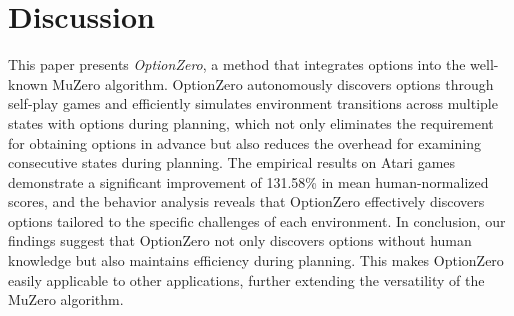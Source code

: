 


\section{Discussion}

This paper presents \textit{OptionZero}, a method that integrates options into the well-known MuZero algorithm.
OptionZero autonomously discovers options through self-play games and efficiently simulates environment transitions across multiple states with options during planning, which not only eliminates the requirement for obtaining options in advance but also reduces the overhead for examining consecutive states during planning.
The empirical results on Atari games demonstrate a significant improvement of 131.58\% in mean human-normalized scores, and the behavior analysis reveals that OptionZero effectively discovers options tailored to the specific challenges of each environment.
In conclusion, our findings suggest that OptionZero not only discovers options without human knowledge but also maintains efficiency during planning.
This makes OptionZero easily applicable to other applications, further extending the versatility of the MuZero algorithm.

